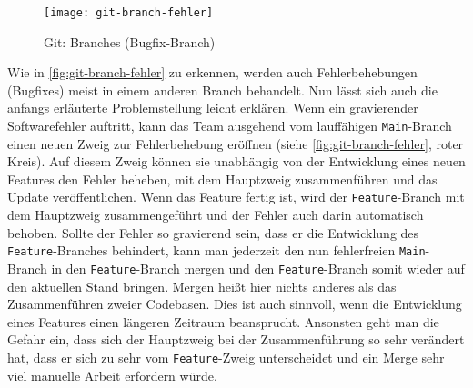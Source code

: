 \begin{figure}[H]
    \centering
    \texttt{[image: git-branch-fehler]}
    \caption{Git: Branches (Bugfix-Branch)}
    \label{fig:git-branch-fehler}
\end{figure}

Wie in \autoref{fig:git-branch-fehler} zu erkennen, werden auch Fehlerbehebungen
(Bugfixes) meist in einem anderen Branch behandelt. Nun lässt sich auch die
anfangs erläuterte Problemstellung leicht erklären. Wenn ein gravierender
Softwarefehler auftritt, kann das Team ausgehend vom lauffähigen
\texttt{Main}-Branch einen neuen Zweig zur Fehlerbehebung eröffnen (siehe
\autoref{fig:git-branch-fehler}, roter Kreis). Auf diesem Zweig können sie
unabhängig von der Entwicklung eines neuen Features den Fehler beheben, mit dem
Hauptzweig zusammenführen und das Update veröffentlichen. Wenn das Feature
fertig ist, wird der \texttt{Feature}-Branch mit dem Hauptzweig zusammengeführt
und der Fehler auch darin automatisch behoben. Sollte der Fehler so gravierend
sein, dass er die Entwicklung des \texttt{Feature}-Branches behindert, kann man 
jederzeit den nun fehlerfreien \texttt{Main}-Branch in den
\texttt{Feature}-Branch mergen und den \texttt{Feature}-Branch somit wieder auf
den aktuellen Stand bringen. Mergen heißt hier nichts anderes als das
Zusammenführen zweier Codebasen. Dies ist auch sinnvoll, wenn die Entwicklung
eines Features einen längeren Zeitraum beansprucht. Ansonsten geht man die
Gefahr ein, dass sich der Hauptzweig bei der Zusammenführung so sehr verändert
hat, dass er sich zu sehr vom \texttt{Feature}-Zweig unterscheidet und ein Merge
sehr viel manuelle Arbeit erfordern würde.
